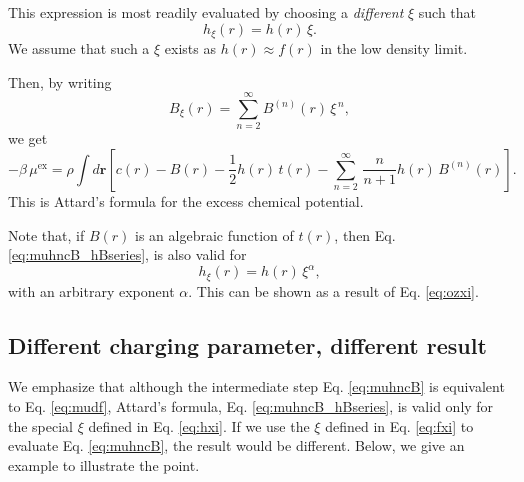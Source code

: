 \documentclass[notitlepage, preprint]{revtex4-1}
\newcommand{\vct}[1]{\mathbf{#1}}
\providecommand{\vr}{} %
\renewcommand{\vr}{\vct{r}}
\newcommand{\supex}[1]{ { { #1 }^{ \mathrm{ex} } } }
\newcommand{\muex}{\supex{\mu}}
\begin{document}
This expression is most readily evaluated
by choosing a \emph{different} $\xi$ such that
\begin{equation}
  h_{\xi}(r) = h(r) \, \xi.
  \label{eq:hxi}
\end{equation}
We assume that such a $\xi$ exists
as $h(r) \approx f(r)$ in the low density limit.

Then, by writing
\begin{equation}
  B_{\xi}(r) = \sum_{n = 2}^\infty B^{(n)}(r) \, {\xi}^{\, n},
\label{eq:Bxi}
\end{equation}
we get\cite{attard1991}
\begin{equation}
  -\beta \, \muex
=
  \rho \int d\vr
  \left[ c(r) - B(r) - \frac{1}{2} h(r) \, t(r)
   - \sum_{n = 2}^\infty \, \frac{n}{n+1} h(r) \, B^{(n)}(r) \right].
\label{eq:muhncB_hBseries}
\end{equation}
This is Attard's formula for the excess chemical potential.


Note that, if $B(r)$ is an algebraic function of $t(r)$,
then Eq. \eqref{eq:muhncB_hBseries}, is also valid for
\begin{equation}
  h_{\xi}(r) = h(r) \, \xi^{\alpha},
  \label{eq:hxi}
\end{equation}
with an arbitrary exponent $\alpha$.
%
This can be shown as a result of Eq. \eqref{eq:ozxi}.





\subsection{Different charging parameter, different result}



We emphasize that although
the intermediate step
Eq. \eqref{eq:muhncB} is equivalent to Eq. \eqref{eq:mudf},
Attard's formula, Eq. \eqref{eq:muhncB_hBseries}, is valid
only for the special $\xi$ defined in Eq. \eqref{eq:hxi}.
%
If we use the $\xi$ defined in Eq. \eqref{eq:fxi}
to evaluate Eq. \eqref{eq:muhncB},
the result would be different.
%
Below, we give an example to illustrate the point.
\end{document}
